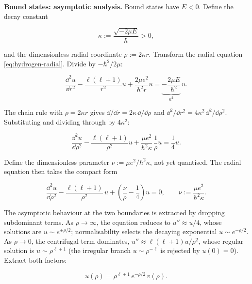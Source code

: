 \medskip\noindent\textbf{Bound states: asymptotic analysis.} Bound states have $E < 0$. Define the decay constant
\begin{linenomath}
\begin{equation*}
\kappa := \frac{\sqrt{-2\mu E}}{\hbar} > 0,
\end{equation*}
\end{linenomath}
and the dimensionless radial coordinate $\rho := 2\kappa r$. Transform the radial equation \eqref{eq:hydrogen-radial}. Divide by $-\hbar^2/2\mu$:
\begin{linenomath}
\begin{equation*}
\frac{\dd^2 u}{\dd r^2} - \frac{\ell(\ell+1)}{r^2}u + \frac{2\mu e^2}{\hbar^2 r}u = \underbrace{-\frac{2\mu E}{\hbar^2}}_{\kappa^2}\,u.
\end{equation*}
\end{linenomath}
The chain rule with $\rho = 2\kappa r$ gives $\dd/\dd r = 2\kappa\,\dd/\dd\rho$ and $\dd^2/\dd r^2 = 4\kappa^2\,\dd^2/\dd\rho^2$. Substituting and dividing through by $4\kappa^2$:
\begin{linenomath}
\begin{equation*}
\frac{\dd^2 u}{\dd\rho^2}
- \frac{\ell(\ell+1)}{\rho^2}u
+ \frac{\mu e^2}{\hbar^2\kappa}\,\frac{1}{\rho}u
= \frac{1}{4}u.
\end{equation*}
\end{linenomath}
Define the dimensionless parameter $\nu := \mu e^2/\hbar^2\kappa$, not yet quantised. The radial equation then takes the compact form
\begin{linenomath}
\begin{equation*}
\frac{\dd^2 u}{\dd\rho^2}
- \frac{\ell(\ell+1)}{\rho^2}\,u
+ \left(\frac{\nu}{\rho} - \frac{1}{4}\right)u = 0,
\qquad
\nu := \frac{\mu e^2}{\hbar^2\kappa}.
\end{equation*}
\end{linenomath} The asymptotic behaviour at the two boundaries is extracted by dropping subdominant terms. As $\rho \to \infty$, the equation reduces to $u'' \approx u/4$, whose solutions are $u \sim e^{\pm\rho/2}$; normalisability selects the decaying exponential $u \sim e^{-\rho/2}$. As $\rho \to 0$, the centrifugal term dominates, $u'' \approx \ell(\ell+1)u/\rho^2$, whose regular solution is $u \sim \rho^{\ell+1}$ (the irregular branch $u\sim\rho^{-\ell}$ is rejected by $u(0)=0$). Extract both factors:
\begin{linenomath}
\begin{equation}
u(\rho) = \rho^{\ell+1}\,e^{-\rho/2}\,v(\rho) .
\label{eq:hydrogen-ansatz}
\end{equation}
\end{linenomath}

